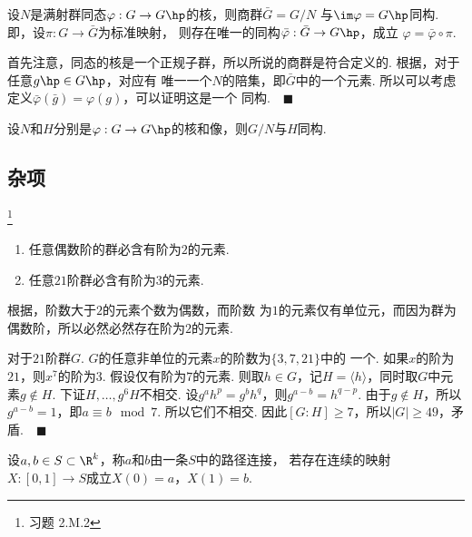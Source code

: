   \begin{thm}[群同构第一定理]
    设$N$是满射群同态$\varphi:G\to G\hp$的核，则商群$\bar{G}=G/N$
    与$\im\varphi=G\hp$同构. 即，设$\pi:G\to\bar{G}$为标准映射，
    则存在唯一的同构$\bar{\varphi}:\bar{G}\to G\hp$，成立
    $\varphi = \bar{\varphi}\circ\pi$.
  \end{thm}
  \proof
    首先注意，同态的核是一个正规子群，所以所说的商群是符合定义的.
    根据，对于任意$g\hp\in G\hp$，对应有
    唯一一个$N$的陪集，即$\bar{G}$中的一个元素. 所以可以考虑
    定义$\bar{\varphi}(\bar{g})=\varphi(g)$，可以证明这是一个
    同构.$\quad\blacksquare$

  \begin{cor}
    设$N$和$H$分别是$\varphi:G\to G\hp$的核和像，则$G/N$与$H$同构.
  \end{cor}

\subsection{杂项}

  \begin{pos}
    \footnote{习题 2.M.2}
    $\,$
    \begin{enumerate}
      \item 任意偶数阶的群必含有阶为$2$的元素.
      \item 任意$21$阶群必含有阶为$3$的元素.
    \end{enumerate}
  \end{pos}
  \proof
    根据，阶数大于$2$的元素个数为偶数，而阶数
    为$1$的元素仅有单位元，而因为群为偶数阶，所以必然必然存在阶为$2$的元素.
    \par
    对于$21$阶群$G$. $G$的任意非单位的元素$x$的阶数为$\{3,7,21\}$中的
    一个. 如果$x$的阶为$21$，则$x^7$的阶为$3$. 假设仅有阶为$7$的元素.
    则取$h\in G$，记$H=\langle h\rangle$，同时取$G$中元素$g\notin H$.
    下证$H,\dots,g^6H$不相交. 设$g^ah^p  = g^bh^q$，则$g^{a-b}=h^{q-p}$.
    由于$g\notin H$，所以$g^{a-b}=1$，即$a\equiv b\mod 7$. 所以它们不相交.
    因此$[G:H]\ge 7$，所以$|G|\ge 49$，矛盾.$\quad\blacksquare$

  \begin{defi}
    \label{defi: 路径连接}
    设$a,b\in S\subset\R^k$，称$a$和$b$由一条$S$中的路径连接，
    若存在连续的映射$X:[0,1]\to S$成立$X(0)=a$，$X(1)=b$.
  \end{defi}
